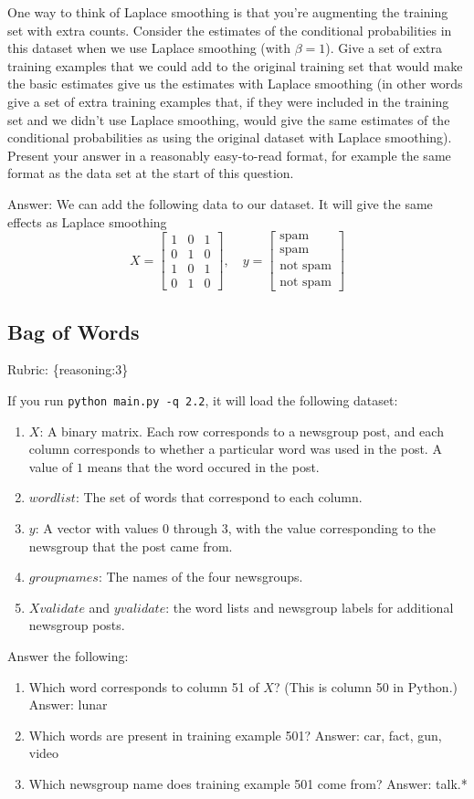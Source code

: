 \documentclass{article}
\def\rubric#1{\gre{Rubric: \{#1\}}}{}
\def\blu#1{{\color{blu}#1}}
\def\gre#1{{\color{gre}#1}}
\def\enum#1{\begin{enumerate}#1\end{enumerate}}
\def\ans#1{\gre{Answer: #1}}{}
\begin{document}
One way to think of Laplace smoothing is that you're augmenting the training set with extra counts. Consider the estimates of the conditional probabilities in this dataset when we use Laplace smoothing (with $\beta = 1$). 
\blu{Give a set of extra training examples that we could add to the original training set that would make the basic estimates give us the estimates with Laplace smoothing} (in other words give a set of extra training examples that, if they were included in the training set and we didn't use Laplace smoothing, would give the same estimates of the conditional probabilities as using the original dataset with Laplace smoothing).
Present your answer in a reasonably easy-to-read format, for example the same format as the data set at the start of this question.

\ans{We can add the following data to our dataset. It will give the same effects as Laplace smoothing
$$X = \begin{bmatrix}1 & 0 & 1\\0 & 1 & 0\\ 1 & 0 & 1\\ 0 & 1 & 0 \end{bmatrix}, \quad y = \begin{bmatrix}
\text{spam} \\ \text{spam} \\ \text{not spam} \\ \text{not spam}
\end{bmatrix}$$}

\subsection{Bag of Words}
\rubric{reasoning:3}

If you run \texttt{python main.py -q 2.2}, it will load the following dataset:
\enum{
\item $X$: A binary matrix. Each row corresponds to a newsgroup post, and each column corresponds to whether a particular word was used in the post. A value of $1$ means that the word occured in the post.
\item $wordlist$: The set of words that correspond to each column.
\item $y$: A vector with values $0$ through $3$, with the value corresponding to the newsgroup that the post came from.
\item $groupnames$: The names of the four newsgroups.
\item $Xvalidate$ and $yvalidate$: the word lists and newsgroup labels for additional newsgroup posts.
}
\blu{Answer the following}:
\enum{
\item Which word corresponds to column 51 of $X$? (This is column 50 in Python.)
\ans{lunar}
\item Which words are present in training example 501?
\ans{car, fact, gun, video}
\item Which newsgroup name does training example 501 come from?
\ans{talk.*}
}
\end{document}
